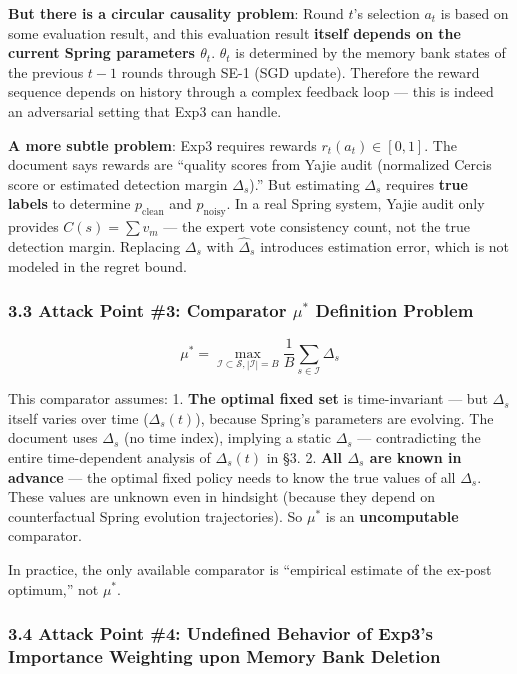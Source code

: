 \documentclass[
  12pt,
]{article}
\begin{document}
\textbf{But there is a circular causality problem}: Round $t$'s selection $a_t$ is based on some evaluation result, and this evaluation result \textbf{itself depends on the current Spring parameters $\theta_t$}. $\theta_t$ is determined by the memory bank states of the previous $t-1$ rounds through SE-1 (SGD update). Therefore the reward sequence depends on history through a complex feedback loop --- this is indeed an adversarial setting that Exp3 can handle. \checkmark

\textbf{A more subtle problem}: Exp3 requires rewards $r_t(a_t) \in [0,1]$. The document says rewards are ``quality scores from Yajie audit (normalized Cercis score or estimated detection margin $\Delta_s$).'' But estimating $\Delta_s$ requires \textbf{true labels} to determine $p_{\text{clean}}$ and $p_{\text{noisy}}$. In a real Spring system, Yajie audit only provides $C(s) = \sum v_m$ --- the expert vote consistency count, not the true detection margin. Replacing $\Delta_s$ with $\hat{\Delta}_s$ introduces estimation error, which is not modeled in the regret bound.

\subsubsection{3.3 Attack Point \#3: Comparator $\mu^*$ Definition Problem}\label{attack-3-comparator}

\[\mu^* = \max_{\mathcal{I} \subset \mathcal{S}, |\mathcal{I}| = B} \frac{1}{B} \sum_{s \in \mathcal{I}} \Delta_s\]

This comparator assumes:
1. \textbf{The optimal fixed set} is time-invariant --- but $\Delta_s$ itself varies over time ($\Delta_s(t)$), because Spring's parameters are evolving. The document uses $\Delta_s$ (no time index), implying a static $\Delta_s$ --- contradicting the entire time-dependent analysis of $\Delta_s(t)$ in \S3.
2. \textbf{All $\Delta_s$ are known in advance} --- the optimal fixed policy needs to know the true values of all $\Delta_s$. These values are unknown even in hindsight (because they depend on counterfactual Spring evolution trajectories). So $\mu^*$ is an \textbf{uncomputable} comparator.

In practice, the only available comparator is ``empirical estimate of the ex-post optimum,'' not $\mu^*$.

\subsubsection{3.4 Attack Point \#4: Undefined Behavior of Exp3's Importance Weighting upon Memory Bank Deletion}\label{attack-4-importance-weighting}
\end{document}
